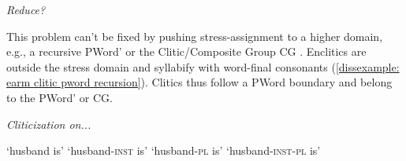 \begin{exe}
	\ex 
	
	\begin{xlist}
		
		\ex {}\textit{Reduce?}
		\ex {}\textit{}
		\ex {}\textit{}
		\ex {}\textit{}
		
		
	\end{xlist}\label{dissexample: final stress earm pword}
	
	
\end{exe}

This problem can't be fixed by pushing   stress-assignment to  a higher domain, e.g., a recursive   PWord' \citep{Peperkamp-1997-ProsodicWord,Selkirk-1996-ProsodicFunctionWords,ItoMester-2009-ExtendedProsodicWord,KabakRevithiadou-2009-InterfaceProsodicWordRecursionUgh} or the Clitic/Composite Group CG \citep{Vogel-2009-StatusCliticGroup,Vogel-2016-LifeAfterSLH}.  Enclitics are outside the stress domain and syllabify with word-final consonants (\ref{dissexample: earm clitic pword recursion}).   Clitics thus follow  a PWord boundary and belong to the PWord' or CG.  




\begin{exe}
	\ex \textit{Cliticization on...}\label{dissexample: earm clitic pword recursion}
	
	\begin{xlist}
		
		\ex {}`husband is'
		\ex {}`husband-\textsc{inst} is' 
		\ex {}`husband-\textsc{pl} is' 
		\ex {}`husband-\textsc{inst-pl} is' 
		
		
	\end{xlist}
	
	
\end{exe}


